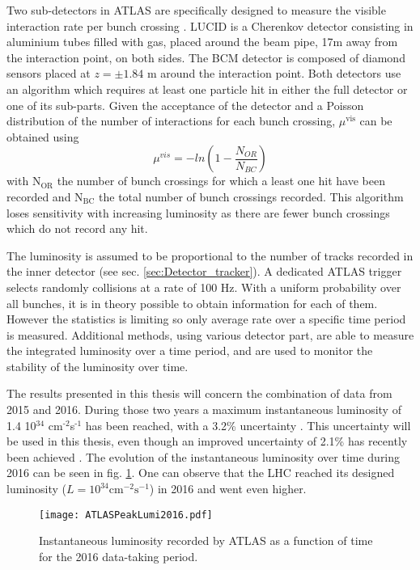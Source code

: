 Two sub-detectors in ATLAS are specifically designed to measure the visible interaction rate per bunch crossing \cite{CERN-EP-2016-117}.
LUCID is a Cherenkov detector consisting in aluminium tubes filled with gas, placed around the beam pipe, 17m away from the interaction point, on both sides.
The BCM detector is composed of diamond sensors placed at $z=\pm 1.84$ m around the interaction point.
Both detectors use an algorithm which requires at least one particle hit in either the full detector or one of its sub-parts.
Given the acceptance of the detector and a Poisson distribution of the number of interactions for each bunch crossing, \(\mu^{\text{vis}}\) can be obtained using \cite{Grafstrom:2015foa}
\begin{equation}
\mu^{vis} = -ln( 1-\frac{N_{OR}}{N_{BC}})
\end{equation}
with N\(_{\text{OR}}\) the number of bunch crossings for which a least one hit have been recorded and N\(_{\text{BC}}\) the total number of bunch crossings recorded.
This algorithm loses sensitivity with increasing luminosity as there are fewer bunch crossings which do not record any hit.

The luminosity is assumed to be proportional to the number of tracks recorded in the inner detector (see sec. \ref{sec:Detector_tracker}).
A dedicated ATLAS trigger selects randomly collisions at a rate of 100 Hz.
With a uniform probability over all bunches, it is in theory possible to obtain information for each of them.
However the statistics is limiting so only average rate over a specific time period is measured.
Additional methods, using various detector part, are able to measure the integrated luminosity over a time period, and are used to monitor the stability of the luminosity over time.

The results presented in this thesis will concern the combination of data from 2015 and 2016.
During those two years a maximum instantaneous luminosity of 1.4 10\(^{\text{34}}\) cm\(^{\text{-2}}\)s\(^{\text{-1}}\) has been reached, with a 3.2\% uncertainty \cite{luminosityForPhysics,ATL-COM-PHYS-2016-1784}.
This uncertainty will be used in this thesis, even though an improved uncertainty of 2.1\% has recently been achieved \cite{luminosityForPhysics}.
The evolution of the instantaneous luminosity over time during 2016 can be seen in fig. \ref{fig:org729acd8}.
One can observe that the LHC reached its designed luminosity ($L=10^{34} \text{cm}^{-2} \text{s}^{-1}$) in 2016 and went even higher.

\begin{figure}[htbp]
\centering
\texttt{[image: ATLASPeakLumi2016.pdf]}
\caption{\label{fig:org729acd8}
Instantaneous luminosity recorded by ATLAS as a function of time for the 2016 data-taking period.\cite{ATLASPublicLumiRun2}}
\end{figure}



